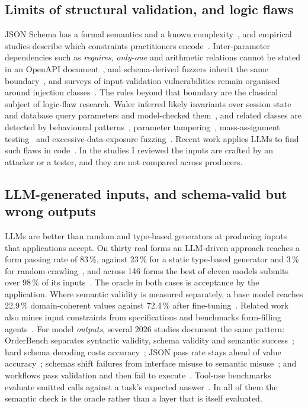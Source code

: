 \documentclass[conference]{IEEEtran}
\begin{document}
\subsection{Limits of structural validation, and logic flaws}
JSON Schema has a formal semantics and a known
complexity~\cite{pezoa2016foundations,attouche2023jsonschema}, and empirical studies describe which
constraints practitioners encode~\cite{baazizi2021usagenot}. Inter-parameter dependencies such as
\emph{requires}, \emph{only-one} and arithmetic relations cannot be stated in an OpenAPI
document~\cite{martinlopez2022idl,martinlopez2019catalogue}, and schema-derived fuzzers inherit the
same boundary~\cite{hatfielddodds2021schemathesis}, and surveys of input-validation vulnerabilities
remain organised around injection classes~\cite{fadlalla2023inputvalidation}. The rules beyond that
boundary are the classical subject of logic-flaw research. Waler inferred likely invariants over
session state and database query parameters and model-checked them~\cite{felmetsger2010waler}, and
related classes are detected by behavioural patterns~\cite{pellegrino2014logicflaws}, parameter
tampering~\cite{bisht2010notamper}, mass-assignment testing~\cite{corradini2023massassignment} and
excessive-data-exposure fuzzing~\cite{pan2024edefuzz}. Recent work applies LLMs to find such flaws in code~\cite{metin2025blv}. In the studies I reviewed the
inputs are crafted by an attacker or a tester, and they are not compared across producers.

\subsection{LLM-generated inputs, and schema-valid but wrong outputs}
LLMs are better than random and type-based generators at producing inputs that applications accept. On
thirty real forms an LLM-driven approach reaches a form passing rate of 83\,\%, against 23\,\% for a
static type-based generator and 3\,\% for random crawling~\cite{alian2024formnexus}, and across 146
forms the best of eleven models submits over 98\,\% of its inputs~\cite{li2026webformtest}. The oracle
in both cases is acceptance by the application. Where semantic validity is measured separately, a base
model reaches 22.9\,\% domain-coherent values against 72.4\,\% after
fine-tuning~\cite{kim2025llamaresttest}. Related work also mines input constraints from specifications and benchmarks form-filling
agents~\cite{li2025formfactory}. For model \emph{outputs},
several 2026 studies document the same pattern: OrderBench separates syntactic validity, schema
validity and semantic success~\cite{li2026orderbench}; hard schema decoding costs
accuracy~\cite{ray2026constrainttax}; JSON pass rate stays ahead of value
accuracy~\cite{singh2026sob}; schemas shift failures from interface misuse to semantic
misuse~\cite{sigdel2026schemafirst}; and workflows pass validation and then fail to
execute~\cite{wrenn2026enterprise}. Tool-use benchmarks evaluate emitted calls against a task's expected
answer~\cite{yu2026wildtoolbench,yu2026parambench}. In all of them the semantic check is the oracle
rather than a layer that is itself evaluated.
\end{document}
